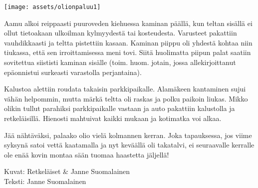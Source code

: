 \begin{multicols}{2}
	\vspace*{0.08cm}
	\noindent\texttt{[image: assets/olionpaluu1]}

	Aamu alkoi reippaasti puuroveden kiehuessa kaminan päällä, kun teltan
	sisällä ei ollut tietoakaan ulkoilman kylmyydestä tai kosteudesta.
	Varusteet pakattiin vauhdikkaasti ja teltta pistettiin kasaan. Kaminan
	piippu oli yhdestä kohtaa niin tiukassa, että sen irroittamisessa meni
	tovi. Siitä huolimatta piipun palat saatiin sovitettua siististi
	kaminan sisälle (toim. huom. jotain, jossa allekirjoittanut epäonnistui
	surkeasti varastolla perjantaina).

	Kalustoa alettiin roudata takaisin parkkipaikalle. Alamäkeen kantaminen
	sujui vähän helpommin, mutta märkä teltta oli raskas ja polku paikoin
	liukas. Mikko olikin tullut parahiksi parkkipaikalle vastaan ja auto
	pakattiin kalustolla ja retkeläisillä. Hienosti mahtuivat kaikki mukaan
	ja kotimatka voi alkaa.

	Jää nähtäväksi, palaako olio vielä kolmannen kerran. Joka tapauksessa,
	jos viime syksynä satoi vettä kaatamalla ja nyt keväällä oli takatalvi,
	ei seuraavalle kerralle ole enää kovin montaa sään tuomaa haastetta
	jäljellä!

\end{multicols}

\vspace*{0.64cm}

\vspace*{0.64cm}
{\raggedleft Kuvat: Retkeläiset \& Janne Suomalainen\\ Teksti: Janne Suomalainen\\}


